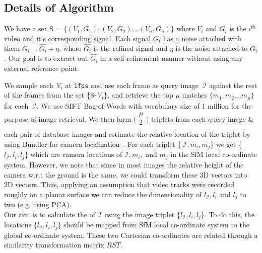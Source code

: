 \subsection{Details of Algorithm}
\label{sec:detail_denosing_algo}
We have a set S = $ \{(V_1,G_1),(V_2,G_2),.. (V_n,G_n)\}$ where $V_i$ and $G_i$ is the $i^{th}$ 
video and it's corresponding \gps signal. Each \gps signal $G_i$ has a noise attached 
with them $G_i = \hat{G_i} + \eta$, where $\hat{G_i}$ is the refined signal and $\eta$ is the 
noise attached to $G_i$. Our goal is to extract out $\hat{G_i}$ in a self-refinement manner 
without using any external reference point.

We sample each \textit{V$_i$} at {\tt 1fps} and use each frame as query image $~\mathcal{I}$ 
against the rest of the frames from the set \{S-\textit{V$_i$}\}, and retrieve the top $\mu$ matches 
$\{m_1,m_2,.. m_\mu \}$ for each $~\mathcal{I}$. We use SIFT Bag-of-Words with vocabulary 
size of 1 million for the purpose of image retrieval. We then form  
$\bigl(\begin{smallmatrix}
\mu \\ 2\\
\end{smallmatrix} \bigr)$ 
triplets from each query image \& each pair of database images and estimate the relative location of
the triplet by using Bundler for camera localization~\cite{wu2011multicore}. For each triplet \{$~\mathcal{I}, m_i, m_j$\} 
we get \{$l_\mathcal{I}, l_i, l_j$\} which are camera locations of 
 $\mathcal{I},m_i,$ and $m_j$ in the SfM local co-ordinate system. 
However, we note that since in most images the relative height of the camera
w.r.t the ground is the same, we could transform these 3D vectors into 2D vectors. Thus, applying an assumption that video tracks were recorded 
roughly on a planar surface we can reduce the dimensionality of $l_\mathcal{I}, l_i$ and $l_j$ to two (e.g. using PCA).\\
Our aim is to calculate the \gps of $\mathcal{I}$ using the image triplet \{$l_\mathcal{I},
l_i, l_j$\}. To do this, the locations \{$l_\mathcal{I}, l_i, l_j$\} should be mapped from SfM local
co-ordinate system to the global \gps co-ordinate system. These two Cartesian co-ordinates are
related through a similarity transformation matrix $RST$.

